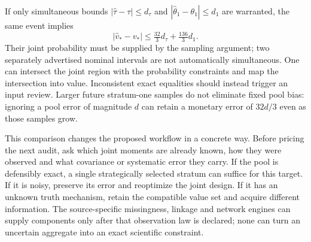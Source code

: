 If only simultaneous bounds $|\widehat\tau-\tau|\leq d_\tau$ and
$|\widehat\theta_1-\theta_1|\leq d_1$ are warranted, the same event implies
\begin{equation}
 |\widehat v_*-v_*|\leq\tfrac{32}{3}d_\tau+
                            \tfrac{136}{3}d_1.
 \label{exec17:s7-noisy-envelope}
\end{equation}
Their joint probability must be supplied by the sampling argument; two
separately advertised nominal intervals are not automatically simultaneous.
One can intersect the joint region with the probability constraints and map
the intersection into value. Inconsistent exact equalities should instead
trigger an input review. Larger future stratum-one samples do not eliminate
fixed pool bias: ignoring a pool error of magnitude $d$ can retain a monetary
error of $32d/3$ even as those samples grow.

This comparison changes the proposed workflow in a concrete way. Before
pricing the next audit, ask which joint moments are already known, how they
were observed and what covariance or systematic error they carry. If the
pool is defensibly exact, a single strategically selected stratum can suffice
for this target. If it is noisy, preserve its error and reoptimize the joint
design. If it has an unknown truth mechanism, retain the compatible value
set and acquire different information. The source-specific missingness,
linkage and network engines can supply components only after that observation
law is declared; none can turn an uncertain aggregate into an exact scientific
constraint.~\citep{exec17_s7_extension}

